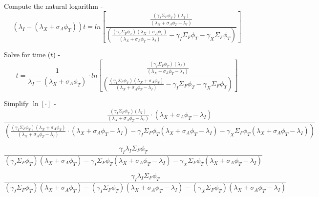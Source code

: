 \documentclass[11pt,a4paper]{article}
\begin{document}
\noindent Compute the natural logarithm - 
\begin{equation}
    (\lambda_I-(\lambda_X+\sigma_A\phi_T))t=ln[\frac{\frac{(\gamma_I\Sigma_F\phi_T)(\lambda_I)}{(\lambda_X+\sigma_A\phi_T-\lambda_I)}}{(\frac{(\gamma_I\Sigma_F\phi_T)(\lambda_X+\sigma_A\phi_T)}{(\lambda_X+\sigma_A\phi_T-\lambda_I)}-\gamma_I\Sigma_F\phi_T-\gamma_X\Sigma_F\phi_T)}]
\end{equation}
\vspace{\baselineskip}

\noindent Solve for time ($t$) - 
\begin{equation} \label{eq-xe-equil-time}
    t=\frac{1}{\lambda_I-(\lambda_X+\sigma_A\phi_T)}\cdot  ln[\frac{\frac{(\gamma_I\Sigma_F\phi_T)(\lambda_I)}{(\lambda_X+\sigma_A\phi_T-\lambda_I)}}{(\frac{(\gamma_I\Sigma_F\phi_T)(\lambda_X+\sigma_A\phi_T)}{(\lambda_X+\sigma_A\phi_T-\lambda_I)}-\gamma_I\Sigma_F\phi_T-\gamma_X\Sigma_F\phi_T)}]
\end{equation}
\vspace{\baselineskip}

\noindent Simplify $\ln[\cdot]$ - 
\begin{equation}
    \frac{\frac{(\gamma_I\Sigma_F\phi_T)(\lambda_I)}{(\lambda_X+\sigma_A\phi_T-\lambda_I)} \cdot (\lambda_X+\sigma_A\phi_T-\lambda_I)}{(\frac{(\gamma_I\Sigma_F\phi_T)(\lambda_X+\sigma_A\phi_T)}{(\lambda_X+\sigma_A\phi_T-\lambda_I)} \cdot (\lambda_X+\sigma_A\phi_T-\lambda_I) - \gamma_I\Sigma_F\phi_T(\lambda_X+\sigma_A\phi_T-\lambda_I) - \gamma_X\Sigma_F\phi_T(\lambda_X+\sigma_A\phi_T-\lambda_I))}
\end{equation}
\vspace{\baselineskip}

\begin{equation}
    \frac{
        \gamma_I\lambda_I\Sigma_F\phi_T
    }
    {
        (\gamma_I\Sigma_F\phi_T)(\lambda_X+\sigma_A\phi_T)
        - \gamma_I\Sigma_F\phi_T(\lambda_X+\sigma_A\phi_T-\lambda_I) 
        - \gamma_X\Sigma_F\phi_T(\lambda_X+\sigma_A\phi_T-\lambda_I)
    }
\end{equation}
\vspace{\baselineskip}

\begin{equation}
    \frac{
        \gamma_I\lambda_I\Sigma_F\phi_T
    }
    {
        (\gamma_I\Sigma_F\phi_T)(\lambda_X+\sigma_A\phi_T)
        - (\gamma_I\Sigma_F\phi_T)(\lambda_X+\sigma_A\phi_T-\lambda_I) 
        - (\gamma_X\Sigma_F\phi_T)(\lambda_X+\sigma_A\phi_T-\lambda_I)
    }
\end{equation}
\vspace{\baselineskip}
\end{document}
